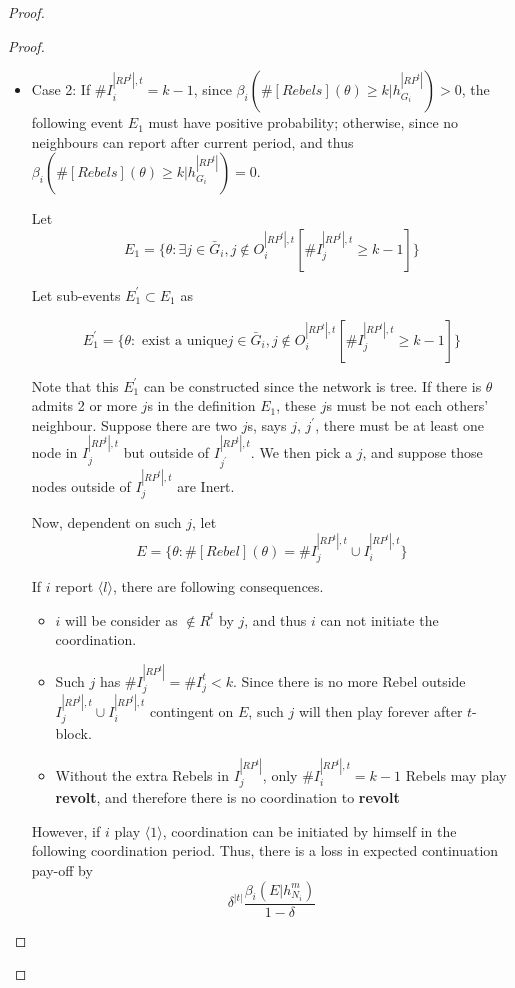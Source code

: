 \documentclass[12pt,letter]{article}
\theoremstyle{definition}
\theoremstyle{remark}
\theoremstyle{claim}
\begin{document}
\begin{proof}
\begin{proof}
\begin{itemize}
\item Case 2: If $\#I^{|RP^t|,t}_i= k-1$, since $\beta_{i}(\#[Rebels](\theta)\geq k|h^{|RP^t|}_{G_i})>0$, the following event $E_1$ must have positive probability; otherwise, since no neighbours can report after current period, and thus $\beta_{i}(\#[Rebels](\theta)\geq k|h^{|RP^t|}_{G_i})=0$.

Let
\[E_1=\{\theta: \exists j\in \bar{G}_i, j\notin O^{|RP^t|,t}_i [\#I^{|RP^t|,t}_j\geq k-1]\}\]


Let sub-events $E^{'}_1\subset E_1$ as

\[E^{'}_1=\{\theta: \text{ exist a unique} j\in \bar{G}_i, j\notin O^{|RP^t|,t}_i [\#I^{|RP^t|,t}_j\geq k-1]\}\] 

Note that this $E^{'}_1$ can be constructed since the network is tree. If there is $\theta$ admits 2 or more $j$s in the definition $E_1$, these $j$s must be not each others' neighbour. Suppose there are two $j$s, says $j$, $j^{'}$, there must be at least one node in $I^{|RP^t|,t}_j$ but outside of $I^{|RP^t|,t}_{j^{'}}$. We then pick a $j$, and suppose those nodes outside of $I^{|RP^t|,t}_j$ are Inert.

Now, dependent on such $j$, let
\[E=\{\theta:\#[Rebel](\theta)=\#I^{|RP^t|,t}_j\cup I^{|RP^t|,t}_i\}\]

If $i$ report $\langle l \rangle$, there are following consequences.

\begin{itemize}
\item $i$ will be consider as $\notin R^t$ by $j$, and thus $i$ can not initiate the coordination.
\item Such $j$ has $\#I^{|RP^t|}_j=\#I^t_j<k$. Since there is no more Rebel outside $I^{|RP^t|,t}_j\cup I^{|RP^t|,t}_i$ contingent on $E$, such $j$ will then play  forever after $t$-block.
\item Without the extra Rebels in $I^{|RP^t|}_j$, only $\#I^{|RP^t|,t}_i= k-1$ Rebels may play \textbf{revolt}, and therefore there is no coordination to \textbf{revolt}
\end{itemize}

However, if $i$ play $\langle 1 \rangle$, coordination can be initiated by himself in the following coordination period. Thus, there is a loss in expected continuation pay-off by
\[\delta^{|t|}\frac{\beta_{i}(E|h^{m}_{N_i})}{1-\delta} \]
\end{itemize}

\end{proof}





\end{proof}
\end{document}
